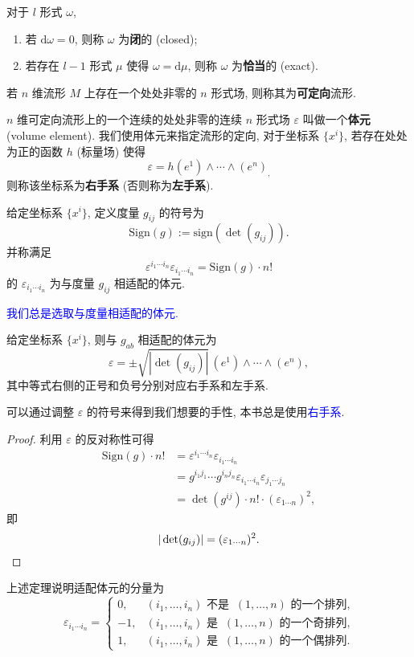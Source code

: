 \begin{definition}
    对于 $ l $ 形式 $ \omega $,
    \begin{enumerate}
        \item 若 $ \mathrm{d}\omega=0 $, 则称 $ \omega $ 为{\bf 闭}的 (closed);
        \item 若存在 $ l-1 $ 形式 $ \mu $ 使得 $ \omega=\mathrm{d}\mu $, 则称 $ \omega $ 为{\bf 恰当}的 (exact).
    \end{enumerate}
\end{definition}
\begin{definition}[可定向流形]
	若 $n$ 维流形 $M$ 上存在一个处处非零的 $n$ 形式场, 则称其为{\bf 可定向}流形.
\end{definition}
\begin{definition}[体元]
    $ n $ 维可定向流形上的一个连续的处处非零的连续 $ n $ 形式场 $ \varepsilon $ 叫做一个{\bf 体元} (volume element). 我们使用体元来指定流形的定向, 对于坐标系 $\{x^i\}$, 若存在处处为正的函数 $h$ (标量场) 使得
	\[ \varepsilon=h(e^1)\wedge\cdots\wedge(e^n)_, \] 
	则称该坐标系为{\bf 右手系} (否则称为{\bf 左手系}). 
\end{definition}
\begin{definition}
	给定坐标系 $\{x^i\}$, 定义度量 $g_{ij}$ 的符号为 
	\[ \mathrm{Sign}(g):=\mathrm{sign}(\det(g_{ij})). \]
	并称满足
	\[ \varepsilon^{i_1\cdots i_n}\varepsilon_{i_1\cdots i_n}=\mathrm{Sign}(g)\cdot n! \]
	的 $\varepsilon_{i_1\cdots i_n}$ 为与度量 $g_{ij}$ 相适配的体元.
\end{definition}
\textcolor{blue}{我们总是选取与度量相适配的体元.}
\begin{theorem}
    给定坐标系 $\{x^i\}$, 则与 $g_{ab}$ 相适配的体元为
    \[ \varepsilon=\pm\sqrt{|\det(g_{ij})|}\,(e^1)\wedge\cdots\wedge(e^n), \]
    其中等式右侧的正号和负号分别对应右手系和左手系. 
\end{theorem}
\begin{remark}
    可以通过调整 $\varepsilon$ 的符号来得到我们想要的手性, 本书总是使用\textcolor{blue}{右手系}.
\end{remark}
\begin{proof}
	利用 $\varepsilon$ 的反对称性可得
	\begin{align*}
		\mathrm{Sign}(g)\cdot n!&=\varepsilon^{i_1\cdots i_n}\varepsilon_{i_1\cdots i_n}\\
		&=g^{i_1j_1}\cdots g^{i_nj_n}\varepsilon_{i_1\cdots i_n}\varepsilon_{j_1\cdots j_n}\\
		&=\det(g^{ij})\cdot n!\cdot(\varepsilon_{1\cdots n})^2,
	\end{align*}
	即
	\[ |\det(g_{ij})|=(\varepsilon_{1\cdots n})^2.\qedhere \] 
\end{proof}
上述定理说明适配体元的分量为
\[ \varepsilon_{i_1\cdots i_n}=\begin{cases}
	0, & (i_1,\dots, i_n) \text{ 不是 }\ (1,\dots,n) \text{ 的一个排列,}\\
	-1, & (i_1,\dots, i_n) \text{ 是 }\ (1,\dots,n) \text{ 的一个奇排列,}\\
	1, & (i_1,\dots, i_n) \text{ 是 }\ (1,\dots,n) \text{ 的一个偶排列.}
\end{cases} \] 

